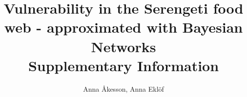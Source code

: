 \documentclass[11pt, a4paper]{article}
\begin{document}
\title{Vulnerability in the Serengeti food web - approximated with Bayesian Networks\\ \medskip Supplementary Information}
\author{Anna {\AA}kesson, Anna Ekl\"of}
\date{}

\maketitle
\end{document}
